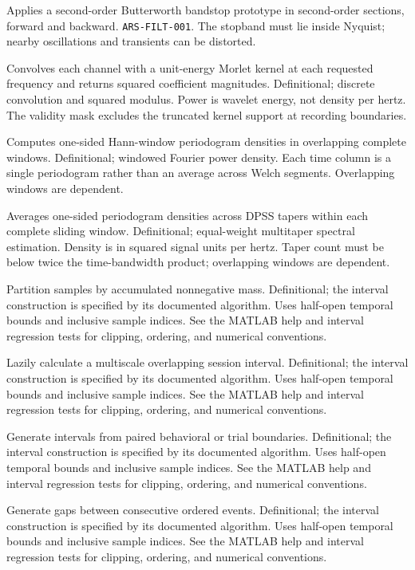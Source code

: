 {Applies a second-order Butterworth bandstop prototype in second-order sections, forward and backward.}
{\texttt{ARS-FILT-001}.}
{The stopband must lie inside Nyquist; nearby oscillations and transients can be distorted.}

{Convolves each channel with a unit-energy Morlet kernel at each requested frequency and returns squared coefficient magnitudes.}
{Definitional; discrete convolution and squared modulus.}
{Power is wavelet energy, not density per hertz. The validity mask excludes the truncated kernel support at recording boundaries.}

{Computes one-sided Hann-window periodogram densities in overlapping complete windows.}
{Definitional; windowed Fourier power density.}
{Each time column is a single periodogram rather than an average across Welch segments. Overlapping windows are dependent.}

{Averages one-sided periodogram densities across DPSS tapers within each complete sliding window.}
{Definitional; equal-weight multitaper spectral estimation.}
{Density is in squared signal units per hertz. Taper count must be below twice the time-bandwidth product; overlapping windows are dependent.}

{Partition samples by accumulated nonnegative mass.}
{Definitional; the interval construction is specified by its documented algorithm.}
{Uses half-open temporal bounds and inclusive sample indices. See the MATLAB help and interval regression tests for clipping, ordering, and numerical conventions.}

{Lazily calculate a multiscale overlapping session interval.}
{Definitional; the interval construction is specified by its documented algorithm.}
{Uses half-open temporal bounds and inclusive sample indices. See the MATLAB help and interval regression tests for clipping, ordering, and numerical conventions.}

{Generate intervals from paired behavioral or trial boundaries.}
{Definitional; the interval construction is specified by its documented algorithm.}
{Uses half-open temporal bounds and inclusive sample indices. See the MATLAB help and interval regression tests for clipping, ordering, and numerical conventions.}

{Generate gaps between consecutive ordered events.}
{Definitional; the interval construction is specified by its documented algorithm.}
{Uses half-open temporal bounds and inclusive sample indices. See the MATLAB help and interval regression tests for clipping, ordering, and numerical conventions.}

